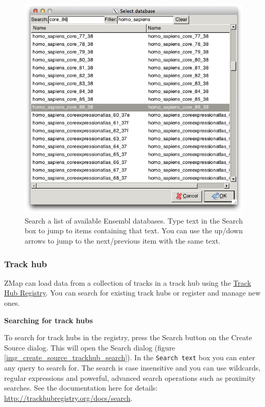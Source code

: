 \documentclass[letterpaper]{article}
\begin{document}
\begin{figure}
\centering
\color[rgb]{0.30980393,0.5058824,0.7411765}
\includegraphics[resolution=150]{images/create_source_ensembl_search_db.png}
\caption{Search a list of available Ensembl databases. Type text in the Search box to jump to items containing that text. You can use the up/down arrows to jump to the next/previous item with the same text.}
\label{img_create_source_ensembl_search_db}
\end{figure}

\subsubsection{Track  hub}
\label{sec_trackhub}
ZMap can load data from a collection of tracks in a track hub using the \href{http://trackhubregistry.org/}{Track Hub Registry}. You can search for existing track hubs or register and manage new ones.

\textbf{Searching for track hubs}

To search for track hubs in the registry, press the Search button on the Create Source dialog. This will open the Search dialog (figure \ref{img_create_source_trackhub_search}). In the \lstinline{Search text} box you can enter any query to search for. The search is case insensitive and you can use wildcards, regular expressions and powerful, advanced search operations such as proximity searches. See the documentation here for details: \url{http://trackhubregistry.org/docs/search}. 
\end{document}
